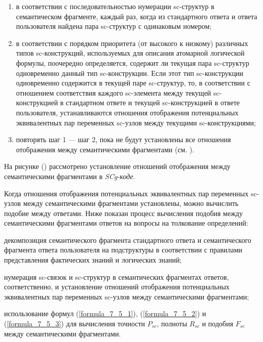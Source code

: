 \begin{enumerate}
	\item в соответствии с последовательностью нумерации sc-структур в семантическом фрагменте, каждый раз, когда из стандартного ответа и ответа пользователя найдена пара sc-структур с одинаковым номером;
	\item в соответствии с порядком приоритета (от высокого к низкому) различных типов sc-конструкций, используемых для описания атомарной логической формулы, поочередно определяется, содержит ли текущая пара sc-структур одновременно данный тип sc-конструкции. Если этот тип sc-конструкции одновременно содержится в текущей паре sc-структур, то, в соответствии с отношением соответствия каждого sc-элемента между текущей sc-конструкцией в стандартном ответе и текущей sc-конструкцией в ответе пользователя, устанавливаются отношения отображения потенциальных эквивалентных пар переменных sc-узлов между текущими sc-конструкциями;
	\item повторять шаг 1 --- шаг 2, пока не будут установлены все отношения отображения между семантическими фрагментами (см. ).
\end{enumerate}

На рисунке (\textit{}) рассмотрено установление отношений отображения между семантическими фрагментами в \textit{SCg-коде}.

Когда отношения отображения потенциальных эквивалентных пар переменных sc-узлов между семантическими фрагментами установлены, можно вычислить подобие между ответами. Ниже показан процесс вычисления подобия между семантическими фрагментами ответов на вопросы на толкование определений:

\begin{textitemize}
	\item декомпозиция семантического фрагмента стандартного ответа и семантического фрагмента ответа пользователя на подструктуры в соответствии с правилами представления фактических знаний и логических знаний;
	\item нумерация sc-связок и sc-структур в семантических фрагментах ответов, соответственно, и установление отношений отображения потенциальных эквивалентных пар переменных sc-узлов между семантическими фрагментами;
	\item использование формул (\ref{formula_7_5_1}), (\ref{formula_7_5_2}) и (\ref{formula_7_5_3}) для вычисления точности $P_{sc}$, полноты $R_{sc}$ и подобия $F_{sc}$ между семантическими фрагментами. 
\end{textitemize}

